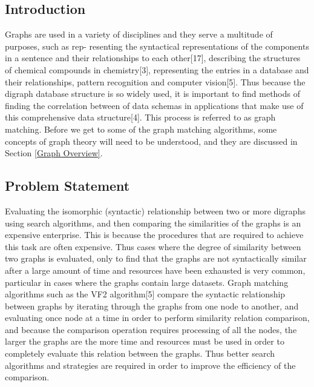 \label{Introduction}
\subsection{Introduction}
Graphs are used in a variety of disciplines and they serve a multitude of purposes, such as rep-
resenting the syntactical representations of the components in a sentence and their relationships
to each other[17], describing the structures of chemical compounds in chemistry[3], representing
the entries in a database and their relationships, pattern recognition and computer vision[5]. Thus
because the digraph database structure is so widely used, it is important to find methods of finding
the correlation between of data schemas in applications that make use of this comprehensive data
structure[4]. This process is referred to as graph matching. Before we get to some of the graph
matching algorithms, some concepts of graph theory will need to be understood, and they are discussed in Section \ref{Graph Overview}.

\subsection{Problem Statement}
Evaluating the isomorphic (syntactic) relationship between two or more digraphs
using search algorithms, and then comparing the similarities of the graphs is an expensive enterprise. 
This is because the procedures that are required to achieve this task are often expensive.
Thus cases where the degree of similarity between two graphs is evaluated,
only to find that the graphs are not syntactically similar after a large amount of time and resources
have been exhausted is very common, particular in cases where the graphs contain large datasets.\newline\newline
Graph matching algorithms such as the VF2 algorithm[5] compare the syntactic relationship between graphs by iterating through the graphs
from one node to another, and evaluating once node at a time in order to perform similarity relation comparison, and because the comparison
operation requires processing of all the nodes, the larger the graphs are the more time and resources must be used in order to completely evaluate this
relation between the graphs. Thus better search algorithms and strategies are required in order to
improve the efficiency of the comparison.

